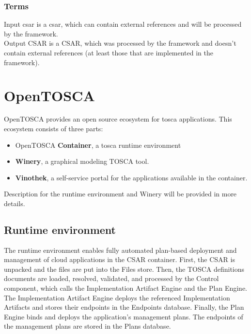 \subsubsection*{Terms}
Input \gls{csar} is a \gls{csar}, which can contain external references and will be processed by the framework.\\
Output CSAR is a CSAR, which was processed by the framework and doesn't contain external references (at least those that are implemented in the framework).

\section{OpenTOSCA} \label{sec:opentosca}
OpenTOSCA provides an open source ecosystem for \gls{tosca} applications. 
This ecosystem consists of three parts: \cite*{OpenTOSCA}
\begin{itemize}
	\item OpenTOSCA \textbf{Container}, a \gls{tosca} runtime environment
	\item \textbf{Winery}, a graphical modeling TOSCA tool.
	\item \textbf{Vinothek}, a self-service portal for the applications available in the container.
\end{itemize}
Description for the runtime environment and Winery will be provided in more details. 
\subsection*{Runtime environment}
The runtime environment enables fully automated plan-based deployment and management of cloud applications in the CSAR container. 
First, the CSAR is unpacked and the files are put into the Files store.
Then, the TOSCA definitions documents are loaded, resolved, validated, and processed by the Control component, which calls the Implementation Artifact Engine and the Plan Engine.
The Implementation Artifact Engine deploys the referenced Implementation Artifacts and stores their endpoints in the Endpoints database. 
Finally, the Plan Engine binds and deploys the application’s management plans.
The endpoints of the management plans are stored in the Plans database.
\cite{INPROC-2013-45}
